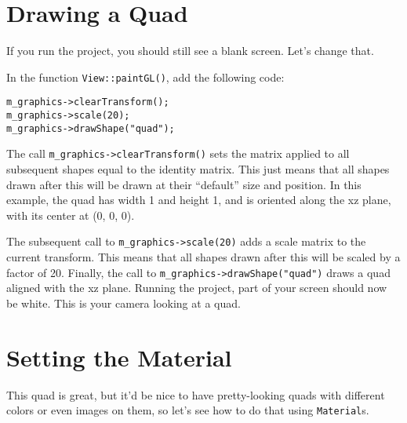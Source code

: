 \documentclass{cs195u}
\begin{document}
\section*{Drawing a Quad}

If you run the project, you should still see a blank screen. Let’s change that. 

In the function \texttt{View::paintGL()}, add the following code:

\texttt{m\_graphics->clearTransform();}\\
\texttt{m\_graphics->scale(20);}\\
\texttt{m\_graphics->drawShape("quad");}

The call \texttt{m\_graphics->clearTransform()} sets the matrix applied to all subsequent shapes equal to the identity matrix. This just means that all shapes drawn after this will be drawn at their “default” size and position. In this example, the quad has width 1 and height 1, and is oriented along the xz plane, with its center at (0, 0, 0).

The subsequent call to \texttt{m\_graphics->scale(20)} adds a scale matrix to the current transform. This means that all shapes drawn after this will be scaled by a factor of 20. Finally, the call to \texttt{m\_graphics->drawShape("quad")} draws a quad aligned with the xz plane. Running the project, part of your screen should now be white. This is your camera looking at a quad.

\section*{Setting the Material}

This quad is great, but it’d be nice to have pretty-looking quads with different colors or even images on them, so let’s see how to do that using \texttt{Material}s.
\end{document}

